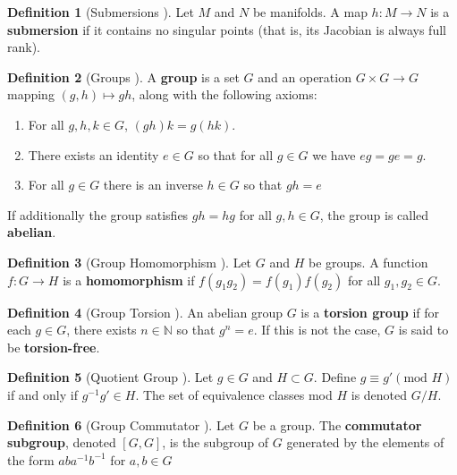 \documentclass[12pt]{article}
\theoremstyle{definition}
\newtheorem{defn}{Definition}
\begin{document}
\begin{defn}[Submersions \cite{robots-fiber-bundles}]
    Let \(M\) and \(N\) be manifolds. A map \(h : M \rightarrow N\) is a
    \textbf{submersion} if it contains no singular points (that is, its Jacobian
    is always full rank).
\end{defn}

\begin{defn}[Groups \cite{intro-top-manifolds}]
    A \textbf{group} is a set \(G\) and an operation 
    \(G\times G \rightarrow G\) mapping \((g,h) \mapsto gh\), along with
    the following axioms:
    \begin{enumerate}
        \item For all \(g,h,k \in G\), \((gh)k = g(hk)\).
        \item There exists an identity \(e \in G\) so that for all \(g \in G\)
            we have \(eg = ge = g\).
        \item For all \(g \in G\) there is an inverse \(h \in G\) so that
        \(gh = e\)
    \end{enumerate}
    If additionally the group satisfies \(gh = hg\) for all \(g,h \in G\), the
    group is called \textbf{abelian}.
\end{defn}

\begin{defn}[Group Homomorphism \cite{intro-top-manifolds}]
    Let \(G\) and \(H\) be groups. A function \(f : G \rightarrow H\) is a
    \textbf{homomorphism} if \(f(g_1g_2) = f(g_1)f(g_2)\) for all 
    \(g_1,g_2 \in G\).
\end{defn}

\begin{defn}[Group Torsion \cite{intro-top-manifolds}]
    An abelian group \(G\) is a \textbf{torsion group} if for each \(g \in G\),
    there exists \(n \in \mathbb{N}\) so that \(g^n = e\). If this is not the
    case, \(G\) is said to be \textbf{torsion-free}.
\end{defn}

\begin{defn}[Quotient Group \cite{intro-top-manifolds}]
    Let \(g \in G\) and \(H \subset G\). Define \(g \equiv g' (\text{mod } H)\)
    if and only if \(g^{-1}g' \in H\). The set of equivalence classes mod \(H\)
    is denoted \(G/H\).
\end{defn}

\begin{defn}[Group Commutator \cite{intro-top-manifolds}]
    Let \(G\) be a group. The \textbf{commutator subgroup}, denoted \([G,G]\),
    is the subgroup of \(G\) generated by the elements of the form
    \(a b a^{-1} b^{-1}\) for \(a,b \in G\)
\end{defn}
\end{document}
